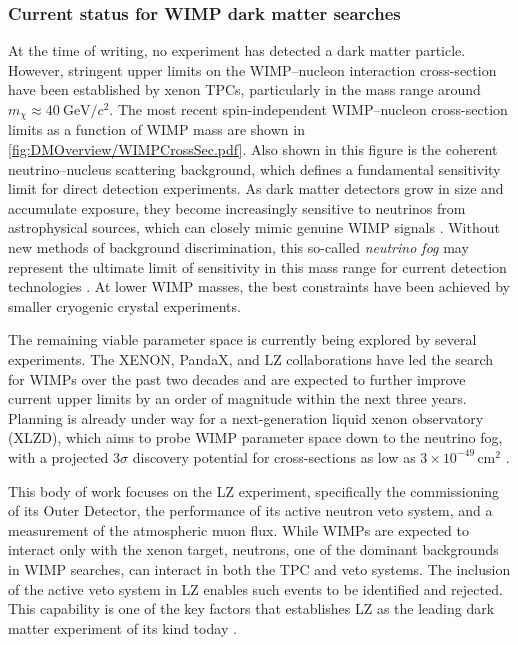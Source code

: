 \subsubsection{Current status for WIMP dark matter searches}\label{sec:DMOverview/DMCurrentStatus}
At the time of writing, no experiment has detected a dark matter particle. However, stringent upper limits on the WIMP–nucleon interaction cross-section have been established by xenon TPCs, particularly in the mass range around $m_\chi \approx 40~\text{GeV}/c^2$. The most recent spin-independent WIMP–nucleon cross-section limits as a function of WIMP mass are shown in \autoref{fig:DMOverview/WIMPCrossSec.pdf}. Also shown in this figure is the coherent neutrino–nucleus scattering background, which defines a fundamental sensitivity limit for direct detection experiments. As dark matter detectors grow in size and accumulate exposure, they become increasingly sensitive to neutrinos from astrophysical sources, which can closely mimic genuine WIMP signals \cite{Billard:2013qya}. Without new methods of background discrimination, this so-called \textit{neutrino fog} may represent the ultimate limit of sensitivity in this mass range for current detection technologies \cite{Boehm:2018sux}. At lower WIMP masses, the best constraints have been achieved by smaller cryogenic crystal experiments.

The remaining viable parameter space is currently being explored by several experiments. The XENON, PandaX, and LZ collaborations have led the search for WIMPs over the past two decades and are expected to further improve current upper limits by an order of magnitude within the next three years. Planning is already under way for a next-generation liquid xenon observatory (XLZD), which aims to probe WIMP parameter space down to the neutrino fog, with a projected $3\sigma$ discovery potential for cross-sections as low as $3\times10^{-49}\,\text{cm}^2$ \cite{XLZD:2024nsu}.


This body of work focuses on the LZ experiment, specifically the commissioning of its Outer Detector, the performance of its active neutron veto system, and a measurement of the atmospheric muon flux. While WIMPs are expected to interact only with the xenon target, neutrons, one of the dominant backgrounds in WIMP searches, can interact in both the TPC and veto systems. The inclusion of the active veto system in LZ enables such events to be identified and rejected. This capability is one of the key factors that establishes LZ as the leading dark matter experiment of its kind today \cite{LZ:2024zvo}.

